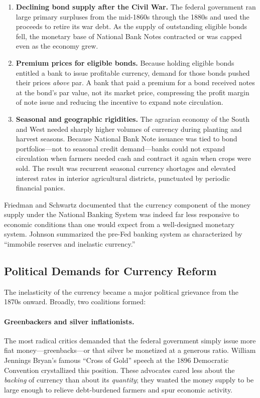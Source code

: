 \documentclass[12pt]{article}
\begin{document}
\begin{enumerate}
  \item \textbf{Declining bond supply after the Civil War.}  The federal government
    ran large primary surpluses from the mid-1860s through the 1880s and used the
    proceeds to retire its war debt.  As the supply of outstanding eligible bonds
    fell, the monetary base of National Bank Notes contracted or was capped even as
    the economy grew.

  \item \textbf{Premium prices for eligible bonds.}  Because holding eligible bonds
    entitled a bank to issue profitable currency, demand for those bonds pushed
    their prices \emph{above} par.  A bank that paid a premium for a bond received
    notes at the bond's par value, not its market price, compressing the profit
    margin of note issue and reducing the incentive to expand note circulation.

  \item \textbf{Seasonal and geographic rigidities.}  The agrarian economy of the
    South and West needed sharply higher volumes of currency during planting and
    harvest seasons.  Because National Bank Note issuance was tied to bond
    portfolios---not to seasonal credit demand---banks could not expand circulation
    when farmers needed cash and contract it again when crops were sold.  The result
    was recurrent seasonal currency shortages and elevated interest rates in interior
    agricultural districts, punctuated by periodic financial panics.
\end{enumerate}

Friedman and Schwartz \citep{friedman-schwartz1963} documented that the currency
component of the money supply under the National Banking System was indeed
far less responsive to economic conditions than one would expect from a well-designed
monetary system.  Johnson \citep{johnson1999} summarized the pre-Fed banking system
as characterized by ``immobile reserves and inelastic currency.''

\subsection{Political Demands for Currency Reform}

The inelasticity of the currency became a major political grievance from the
1870s onward.  Broadly, two coalitions formed:

\paragraph{Greenbackers and silver inflationists.}  The most radical critics demanded
that the federal government simply issue more fiat money---greenbacks---or that
silver be monetized at a generous ratio.  William Jennings Bryan's famous ``Cross
of Gold'' speech at the 1896 Democratic Convention crystallized this position.
These advocates cared less about the \emph{backing} of currency than about its
\emph{quantity}; they wanted the money supply to be large enough to relieve
debt-burdened farmers and spur economic activity.
\end{document}
